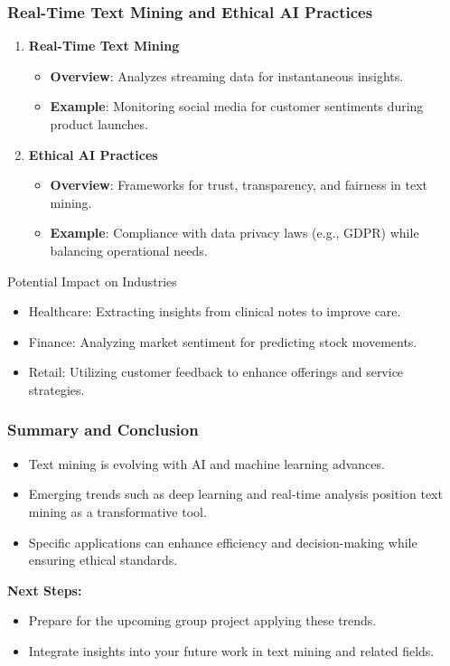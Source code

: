 \documentclass[aspectratio=169]{beamer}
\begin{document}
\begin{frame}[fragile]
    \frametitle{Real-Time Text Mining and Ethical AI Practices}
    \begin{enumerate}[resume]
        \item \textbf{Real-Time Text Mining}  
            \begin{itemize}
                \item \textbf{Overview}: Analyzes streaming data for instantaneous insights.
                \item \textbf{Example}: Monitoring social media for customer sentiments during product launches.
            \end{itemize}
        
        \item \textbf{Ethical AI Practices}  
            \begin{itemize}
                \item \textbf{Overview}: Frameworks for trust, transparency, and fairness in text mining.
                \item \textbf{Example}: Compliance with data privacy laws (e.g., GDPR) while balancing operational needs.
            \end{itemize}
    \end{enumerate}
    
    \begin{block}{Potential Impact on Industries}
        \begin{itemize}
            \item Healthcare: Extracting insights from clinical notes to improve care.
            \item Finance: Analyzing market sentiment for predicting stock movements.
            \item Retail: Utilizing customer feedback to enhance offerings and service strategies.
        \end{itemize}
    \end{block}
\end{frame}

\begin{frame}[fragile]
    \frametitle{Summary and Conclusion}
    \begin{itemize}
        \item Text mining is evolving with AI and machine learning advances.
        \item Emerging trends such as deep learning and real-time analysis position text mining as a transformative tool.
        \item Specific applications can enhance efficiency and decision-making while ensuring ethical standards.
    \end{itemize}

    \textbf{Next Steps:}
    \begin{itemize}
        \item Prepare for the upcoming group project applying these trends.
        \item Integrate insights into your future work in text mining and related fields.
    \end{itemize}
\end{frame}
\end{document}
